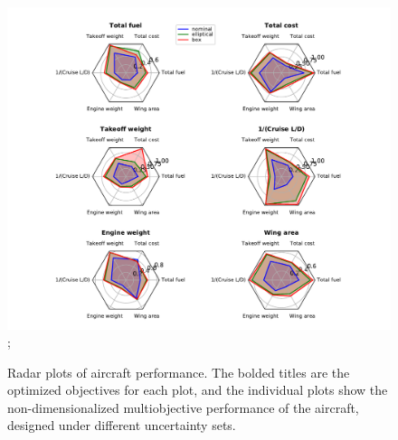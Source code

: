 \begin{figure}[!ht]
\begin{center}
\includegraphics[trim={2cm 0cm 1cm 0cm},clip,scale=0.75]{6objradar.pdf};
\caption{Radar plots of aircraft performance.
The bolded titles are the optimized objectives for each plot, and the individual plots
show the non-dimensionalized multiobjective performance of the aircraft, designed under different
uncertainty sets.}
\label{fig:radar}
\end{center}
\end{figure}

